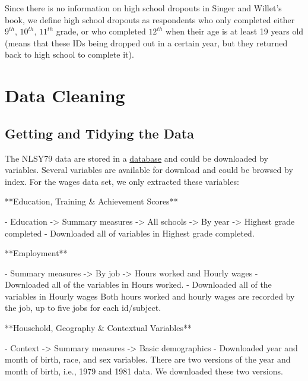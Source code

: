 \documentclass{article}
\begin{document}
Since there is no information on high school dropouts in Singer and Willet's book, we define high school dropouts as respondents who only completed either \(9^{th}\), \(10^{th}\), \(11^{th}\) grade, or who completed \(12^{th}\) when their age is at least 19 years old (means that these IDs being dropped out in a certain year, but they returned back to high school to complete it).

\hypertarget{cleaning}{%
\section{Data Cleaning}\label{cleaning}}

\hypertarget{getting-and-tidying-the-data}{%
\subsection{Getting and Tidying the Data}\label{getting-and-tidying-the-data}}

The NLSY79 data are stored in a \href{https://www.nlsinfo.org/content/cohorts/nlsy79/get-data}{database} and could be downloaded by variables. Several variables are available for download and could be browsed by index. For the wages data set, we only extracted these variables:

\begin{tcolorbox}[width=\textwidth,
                  boxsep=5pt,
                  left=5pt,
                  right=5pt,
                  top=5pt,
                  ]
**Education, Training \& Achievement Scores**

- Education -> Summary measures -> All schools -> By year -> Highest grade completed
  - Downloaded all of variables in Highest grade completed.
  
**Employment**

- Summary measures -> By job -> Hours worked and Hourly wages
  - Downloaded all of the variables in Hours worked.
  - Downloaded all of the variables in Hourly wages
  Both hours worked and hourly wages are recorded by the job, up to five jobs for each id/subject. 
  
**Household, Geography \& Contextual Variables**

- Context -> Summary measures -> Basic demographics 
  - Downloaded year and month of birth, race, and sex variables.
  There are two versions of the year and month of birth, i.e., 1979 and 1981 data. We downloaded these two versions.

\end{tcolorbox}
\end{document}
